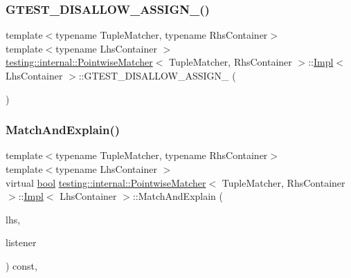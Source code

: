 \subsubsection{\texorpdfstring{G\+T\+E\+S\+T\+\_\+\+D\+I\+S\+A\+L\+L\+O\+W\+\_\+\+A\+S\+S\+I\+G\+N\+\_\+()}{GTEST\_DISALLOW\_ASSIGN\_()}}
{\footnotesize\ttfamily template$<$typename Tuple\+Matcher, typename Rhs\+Container$>$ \\
template$<$typename Lhs\+Container $>$ \\
\hyperlink{classtesting_1_1internal_1_1PointwiseMatcher}{testing\+::internal\+::\+Pointwise\+Matcher}$<$ Tuple\+Matcher, Rhs\+Container $>$\+::\hyperlink{classtesting_1_1internal_1_1PointwiseMatcher_1_1Impl}{Impl}$<$ Lhs\+Container $>$\+::G\+T\+E\+S\+T\+\_\+\+D\+I\+S\+A\+L\+L\+O\+W\+\_\+\+A\+S\+S\+I\+G\+N\+\_\+ (\begin{DoxyParamCaption}\item[{\hyperlink{classtesting_1_1internal_1_1PointwiseMatcher_1_1Impl}{Impl}$<$ Lhs\+Container $>$}]{ }\end{DoxyParamCaption})\hspace{0.3cm}{\ttfamily [private]}}

\mbox{\label{classtesting_1_1internal_1_1PointwiseMatcher_1_1Impl_a4253946989f3743c4dd983909f2d062b}} 
\subsubsection{\texorpdfstring{Match\+And\+Explain()}{MatchAndExplain()}}
{\footnotesize\ttfamily template$<$typename Tuple\+Matcher, typename Rhs\+Container$>$ \\
template$<$typename Lhs\+Container $>$ \\
virtual \hyperlink{classbool}{bool} \hyperlink{classtesting_1_1internal_1_1PointwiseMatcher}{testing\+::internal\+::\+Pointwise\+Matcher}$<$ Tuple\+Matcher, Rhs\+Container $>$\+::\hyperlink{classtesting_1_1internal_1_1PointwiseMatcher_1_1Impl}{Impl}$<$ Lhs\+Container $>$\+::Match\+And\+Explain (\begin{DoxyParamCaption}\item[{Lhs\+Container}]{lhs,  }\item[{\hyperlink{classtesting_1_1MatchResultListener}{Match\+Result\+Listener} $\ast$}]{listener }\end{DoxyParamCaption}) const\hspace{0.3cm}{\ttfamily [inline]}, {\ttfamily [virtual]}}



